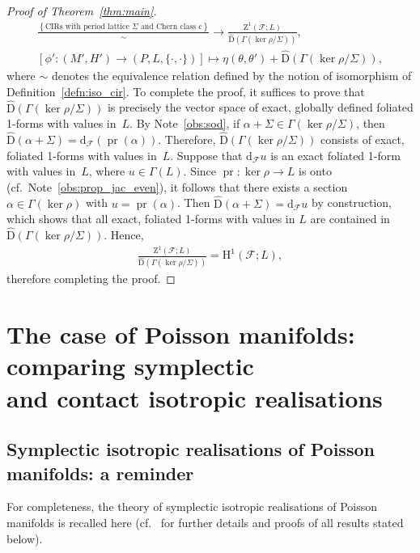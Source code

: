 \documentclass[10pt,a4paper]{amsart}
\numberwithin{equation}{section}
\newcommand{\de}{\mathrm{d}} %
\newcommand{\JM}{(P,L,\{\cdot,\cdot\})} %
\newcommand{\HH}{\mathrm{H}}
\begin{document}
\begin{proof}[Proof of Theorem~\ref{thm:main}]
 \begin{gather} \label{eq:18}
\frac{\left\{ \text{CIRs with period lattice } \Sigma \text{ and Chern
 class } c\right\}}{\sim} \to \frac{\mathrm{Z}^1(\mathcal{F};L)}{\hat{\mathrm{D}}(\Gamma(\ker \rho/\Sigma))}, \\
\left[ \phi' \colon (M',H') \to \JM\right] \mapsto \eta(\theta,\theta') + \hat{\mathrm{D}}(\Gamma(\ker \rho/\Sigma)),\nonumber
 \end{gather}
where $\sim$ denotes the equivalence relation def\/ined by the notion of isomorphism of Def\/inition~\ref{defn:iso_cir}. To complete the proof, it suf\/f\/ices to prove that $\hat{\mathrm{D}}(\Gamma(\ker \rho/\Sigma))$ is precisely the vector space of exact, globally def\/ined foliated 1-forms with values in~$L$. By Note~\ref{obs:sod}, if $\alpha + \Sigma \in \Gamma (\ker \rho/\Sigma )$, then $\hat{\mathrm{D}}(\alpha + \Sigma) = \de_{\mathcal{F}} (\operatorname{pr}(\alpha) )$. Therefore, $\hat{\mathrm{D}}(\Gamma(\ker \rho/\Sigma))$ consists of exact, foliated 1-forms with values in~$L$. Suppose that $\de_{\mathcal{F}}u$ is an exact foliated 1-form with values in~$L$, where $u \in \Gamma(L)$. Since $\operatorname{pr}\colon \ker \rho \to L$ is onto (cf.\ Note~\ref{obs:prop_jac_even}), it follows that there exists a section $\alpha \in \Gamma(\ker \rho)$ with $u = \operatorname{pr}(\alpha)$. Then $\hat{\mathrm{D}}(\alpha + \Sigma) = \de_{\mathcal{F}}u$ by construction, which shows that all exact, foliated 1-forms with values in $L$ are contained in $\hat{\mathrm{D}} (\Gamma (\ker \rho/\Sigma))$. Hence,
 \begin{gather*}
 \frac{\mathrm{Z}^1(\mathcal{F};L)}{\hat{\mathrm{D}}(\Gamma(\ker \rho/\Sigma))} = \HH^1 (\mathcal{F};L ),
 \end{gather*}
therefore completing the proof.
\end{proof}


\section[The case of Poisson manifolds: comparing symplectic and contact isotropic\\ realisations]{The case of Poisson manifolds: comparing symplectic\\ and contact isotropic realisations}\label{sec:sympl-vers-cont}

\subsection{Symplectic isotropic realisations of Poisson manifolds: a reminder}\label{sec:sympl-isotr-real}
For completeness, the theory of symplectic isotropic realisations of Poisson manifolds is recalled here (cf.~\cite{dd} for further details and proofs of all results stated below).
\end{document}
